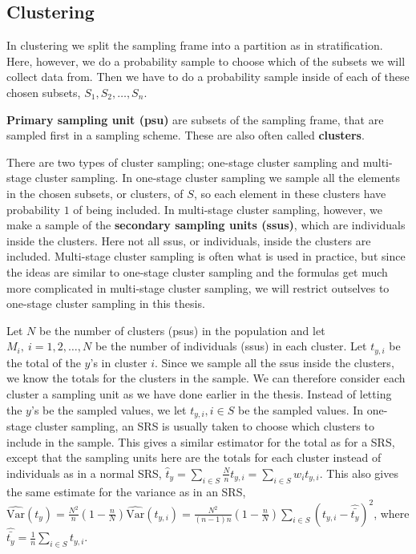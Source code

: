 \documentclass{article}
\begin{document}
\subsection{Clustering} \label{sec:clustering}


In clustering we split the sampling frame into a partition as in stratification.
Here, however, we do a probability sample to choose which of the subsets we will
collect data from. Then we have to do a probability sample
inside of each of these chosen subsets, \(S_1, S_2, \dots, S_n\).

\begin{definition}
 \textbf{Primary sampling unit (psu)} are subsets of the sampling frame, that
 are sampled first in a sampling scheme. These are also often called \textbf{clusters}. 
\end{definition}

There are two types of cluster sampling; one-stage cluster sampling and
multi-stage cluster sampling. In one-stage cluster sampling we sample all the
elements in the chosen subsets, or clusters, of \(S\), so each element in these clusters have probability \(1\)
of being included. In multi-stage cluster sampling, however,
we make a sample of the \textbf{secondary sampling units (ssus)}, which are
individuals inside the clusters. Here not all ssus, or
individuals, inside the clusters are included. Multi-stage cluster sampling is often what is used in
practice, but since the ideas are similar to one-stage cluster sampling and
the formulas get much more complicated in multi-stage cluster sampling,
we will restrict outselves to one-stage cluster sampling in this thesis.

Let \(N\) be the number of clusters (psus) in the population and let \(M_i,\ i =
1, 2, \dots, N\) be the number of individuals (ssus) in each cluster. Let
\(t_{y, i}\) be the total of the \(y\)'s in cluster \(i\). Since we sample all the ssus inside
the clusters, we know the totals for the
clusters in the sample. We can therefore consider each cluster a sampling unit as we
have done earlier in the thesis. Instead of letting the \(y\)'s be the
sampled values, we let \(t_{y, i}, i \in S\) be the sampled values. In one-stage cluster sampling, an SRS is
usually taken to choose which clusters to include in the sample. This gives a
similar estimator for the total as for a SRS, except that the sampling units here
are the totals for each cluster instead of individuals as in a normal SRS,
\(\hat{t}_y = \sum_{i \in S} \frac{N}{n} t_{y, i} = \sum_{i \in S} w_i t_{y, i} \). 
This also gives the same estimate for the variance as in an SRS,
\(\widehat{\mathrm{Var}}\left(t_{y}\right) = \frac{N^2}{n} \left( 1 - \frac{n}{N}
\right) \hat{\mathrm{Var}}\left( t_{y, i} \right) =
\frac{N^2}{\left( n - 1 \right)n} \left( 1 - \frac{n}{N} \right) \sum_{i \in S}
\left( t_{y, i} - \hat{\bar{t_y}} \right)^2\), where \(\hat{\bar{t_y}} =
\frac{1}{n} \sum_{i \in S} t_{y, i}\).
\end{document}
